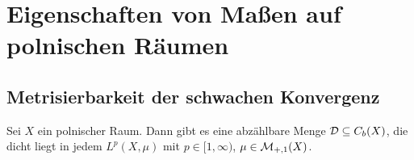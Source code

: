 \documentclass[../main/main.tex]{subfiles}
\begin{document}
	
	\section{Eigenschaften von Maßen auf polnischen Räumen}
	
	\subsection{Metrisierbarkeit der schwachen Konvergenz}
	
	\begin{Satz}
		\label{thm:Lp}
		Sei $X$ ein polnischer Raum. Dann gibt es eine abzählbare Menge 
		$\mathcal{D} \subseteq C_b(X)$, die dicht liegt in jedem 
		$L^p(X, \mu)$ mit $p \in [1, \infty)$, $\mu \in \mathcal{M}_{+,1}(X)$.
	\end{Satz}
	
\end{document}
